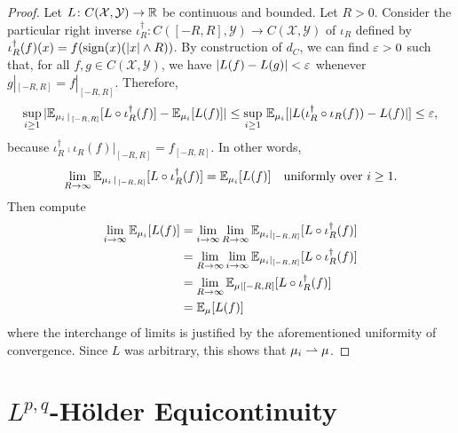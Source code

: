 \documentclass[12pt]{report}
\begin{document}
\begin{proof}
    Let $L\colon C(\mathcal{X}, \mathcal{Y}) \to \mathbb{R}$ be continuous and bounded.
    Let $R > 0$.
    Consider the particular right inverse $\iota_R^\dagger \colon C([-R, R], \mathcal{Y}) \to C(\mathcal{X}, \mathcal{Y})$ of $\iota_R$ defined by $\iota_R^\dagger(f)(x) = f(\operatorname{sign}(x)(\lvert x\rvert \land R))$.
    By construction of $d_C$, we can find $\varepsilon > 0$ such that, for all $f, g \in C(\mathcal{X}, \mathcal{Y})$, we have $\lvert L(f) - L(g)\rvert < \varepsilon$ whenever $g|_{[-R, R]} = f|_{[-R, R]}$.
    Therefore,
    \begin{equation}
        \operatorname*{sup}_{i \ge 1}\,
        \lvert
            \mathbb{E}_{\mu_i\,|\,_{[-R, R]}}[L \circ \iota_R^\dagger(f)] -
            \mathbb{E}_{\mu_i}[L(f)]
        \rvert
        \le
        \operatorname*{sup}_{i \ge 1}\,
        \mathbb{E}_{\mu_i}[\lvert
            L(\iota_R^\dagger \circ \iota_R(f)) -
            L(f)
        \rvert]
        \le \varepsilon,
    \end{equation}
    because $\iota_R^\dagger \comp \iota_R(f)|_{[-R, R]} = f_{[-R, R]}$.
    In other words,
    \begin{equation}
        \lim_{R \to \infty} \mathbb{E}_{\mu_i\,|\,_{[-R, R]}}[L \circ \iota_R^\dagger(f)] = \mathbb{E}_{\mu_i}[L(f)] \quad \text{uniformly over $i \ge 1$}.
    \end{equation}
    Then compute
    \begin{align*}
        \lim_{i \to \infty} \mathbb{E}_{\mu_i}[L(f)]
        &= \lim_{i \to \infty} \lim_{R \to \infty} \mathbb{E}_{\mu_i|_{[-R, R]}}[L \circ \iota_R^\dagger(f)] \\
        &=  \lim_{R \to \infty} \lim_{i \to \infty} \mathbb{E}_{\mu_i|_{[-R, R]}}[L \circ \iota_R^\dagger(f)] \\
        &=  \lim_{R \to \infty} \mathbb{E}_{\mu|{[-R, R]}}[L \circ \iota_R^\dagger(f)] \\
        &= \mathbb{E}_{\mu}[L(f)]
    \end{align*}
    where the interchange of limits is justified by the aforementioned uniformity of convergence.
    Since $L$ was arbitrary, this shows that $\mu_i \rightharpoonup \mu$.
\end{proof}

\section{\texorpdfstring{$L^{p,q}$}{Lpq}-H\"older Equicontinuity}
\end{document}
